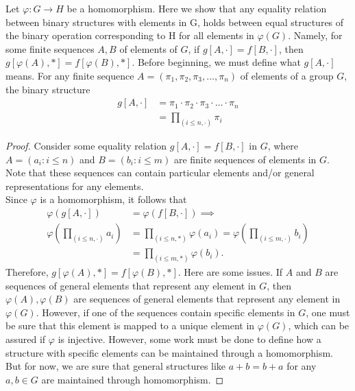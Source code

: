 \documentclass[12pt]{article}
\newenvironment{problem}[2][Problem]{\begin{trivlist} \item[\hskip \labelsep {\bfseries #1}\hskip \labelsep {\bfseries #2.}]}{\end{trivlist}}
\begin{document}
\begin{problem}{II}
  Let $\varphi: G\to H$ be a homomorphism. Here we show that any equality relation between binary structures with elements in G, holds between equal structures of the binary operation corresponding to H for all elements in $\varphi(G)$. Namely, for some finite sequences $A,B$ of elements of $G$, if $g\left[A, \cdot \right] = f\left[ B, \cdot \right]$, then $g\left[ \varphi(A), *\right] = f\left[ \varphi(B), * \right]$. Before beginning, we must define what $g\left[ A, \cdot \right]$ means. For any finite sequence $A=\left( \pi_{1},\pi_{2},\pi_{3},\dots,\pi_{n} \right)$ of elements of a group $G$, the binary structure 
\begin{align*}
  g\left[ A, \cdot \right] &= \pi_{1}\cdot \pi_{2} \cdot \pi_{3}\cdot \ldots \cdot \pi_{n}\\
  &= \prod_{(i\leq n, \cdot)} \pi_{i}
\end{align*}
\end{problem}
\begin{proof}
  Consider some equality relation $g\left[ A,\cdot \right] = f\left[ B,\cdot \right]$ in $G$, where $A=\left( a_{i}:i\leq n \right)$ and $B=\left( b_{i}:i\leq m \right)$ are finite sequences of elements in $G$. Note that these sequences can contain particular elements and/or general representations for any elements. \\
  Since $\varphi$ is a homomorphism, it follows that
\begin{align*}
  \varphi\left( g\left[ A,\cdot \right] \right) &= \varphi\left( f\left[ B,\cdot \right] \right) \implies \\
  \varphi\left( \prod_{(i\leq n, \cdot )} a_{i} \right) &= \prod_{(i\leq n, *)}\varphi(a_{i}) = \varphi\left( \prod_{(i\leq m,\cdot)}b_{i} \right)\\
  &= \prod_{(i\leq m, *)}\varphi(b_{i}).
\end{align*}
Therefore, $g\left[ \varphi(A),* \right] = f\left[ \varphi(B),* \right]$. Here are some issues. If $A$ and $B$ are sequences of general elements that represent any element  in $G$, then $\varphi(A),\varphi(B)$ are sequences of general elements that represent any element in $\varphi(G)$. However, if one of the sequences contain specific elements in $G$, one must be sure that this element is mapped to a unique element in $\varphi(G)$, which can be assured if $\varphi$ is injective. However, some work must be done to define how a structure with specific elements can be maintained through a homomorphism. But for now, we are sure that general structures like $a+b=b+a$ for any $a,b\in G$ are maintained through homomorphism.
\end{proof}
\end{document}
